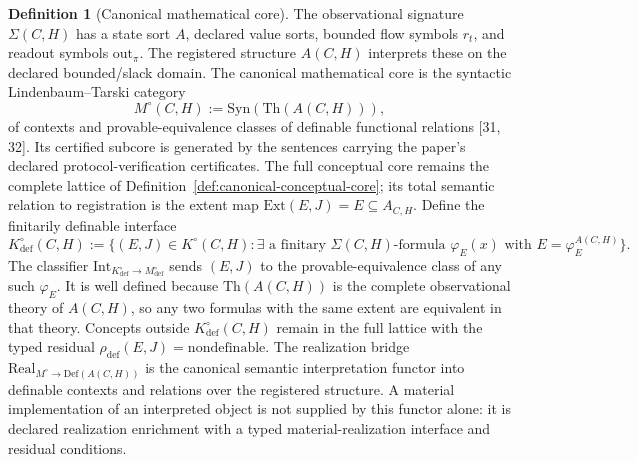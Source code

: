\documentclass[11pt]{article}
\theoremstyle{definition}
\newtheorem{definition}{Definition}
\begin{document}
\begin{definition}[Canonical mathematical core]
\label{def:canonical-mathematical-core}
The observational signature $\Sigma(C, H)$ has a state sort $A$, declared value sorts, bounded flow symbols $r_t$, and readout symbols $\mathrm{out}_\pi$. The registered structure $A(C, H)$ interprets these on the declared bounded/slack domain. The canonical mathematical core is the syntactic Lindenbaum--Tarski category
\[
M^{\circ}(C, H) := \mathrm{Syn}(\mathrm{Th}(A(C, H))),
\]
of contexts and provable-equivalence classes of definable functional relations [31, 32]. Its certified subcore is generated by the sentences carrying the paper's declared protocol-verification certificates. The full conceptual core remains the complete lattice of Definition~\ref{def:canonical-conceptual-core}; its total semantic relation to registration is the extent map $\mathrm{Ext}(E, J) = E \subseteq A_{C,H}$. Define the finitarily definable interface
\[
K^{\circ}_{\mathrm{def}}(C, H) := \{(E, J) \in K^{\circ}(C, H) : \exists \text{ a finitary } \Sigma(C, H)\text{-formula } \varphi_E(x) \text{ with } E = \varphi_E^{A(C,H)}\}.
\]
The classifier $\mathrm{Int}_{K^{\circ}_{\mathrm{def}} \to M^{\circ}_{\mathrm{def}}}$ sends $(E, J)$ to the provable-equivalence class of any such $\varphi_E$. It is well defined because $\mathrm{Th}(A(C, H))$ is the complete observational theory of $A(C, H)$, so any two formulas with the same extent are equivalent in that theory. Concepts outside $K^{\circ}_{\mathrm{def}}(C, H)$ remain in the full lattice with the typed residual $\rho_{\mathrm{def}}(E, J) = \text{nondefinable}$. The realization bridge $\mathrm{Real}_{M^{\circ} \to \mathrm{Def}(A(C,H))}$ is the canonical semantic interpretation functor into definable contexts and relations over the registered structure. A material implementation of an interpreted object is not supplied by this functor alone: it is declared realization enrichment with a typed material-realization interface and residual conditions.
\end{definition}
\end{document}

